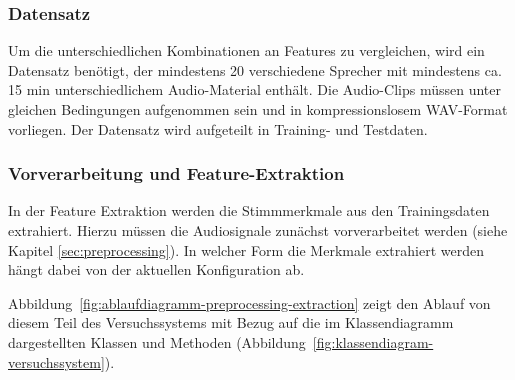 


\subsubsection{Datensatz} \label{sec:KonzeptDatensatz}

Um die unterschiedlichen Kombinationen an Features zu vergleichen, wird ein Datensatz benötigt, der mindestens 20 verschiedene Sprecher mit mindestens ca. 15 min unterschiedlichem Audio-Material enthält.
Die Audio-Clips müssen unter gleichen Bedingungen aufgenommen sein und in kompressionslosem WAV-Format vorliegen.
Der Datensatz wird aufgeteilt in Training- und Testdaten.

\subsubsection{Vorverarbeitung und Feature-Extraktion}

In der Feature Extraktion werden die Stimmmerkmale aus den Trainingsdaten extrahiert.
Hierzu müssen die Audiosignale zunächst vorverarbeitet werden (siehe Kapitel \ref{sec:preprocessing}).
In welcher Form die Merkmale extrahiert werden hängt dabei von der aktuellen Konfiguration ab.

Abbildung~\ref{fig:ablaufdiagramm-preprocessing-extraction} zeigt den Ablauf von diesem Teil des Versuchssystems mit Bezug auf die im Klassendiagramm dargestellten Klassen und Methoden (Abbildung~\ref{fig:klassendiagram-versuchssystem}).

